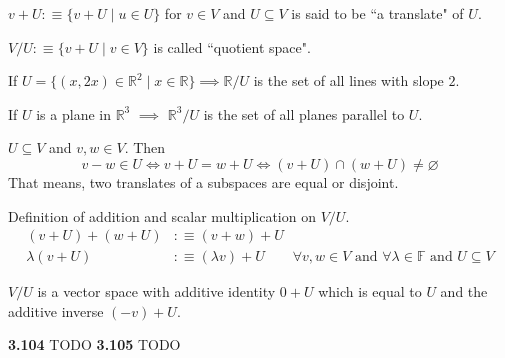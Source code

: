 \setcounter{thm}{94}
\begin{mydef}
  $v+U :\equiv \{v+U \mid u\in U\}$ for $v\in V$ and $U\subseteq V$ is said to be ``a translate" of $U$.
\end{mydef}

\setcounter{thm}{98}
\begin{mydef}
  $V/U :\equiv \{v+U \mid v\in V\}$ is called ``quotient space".
\end{mydef}

\begin{example}
  If $U=\{ (x,2x)\in \mathbb{R}^2 \mid x\in \mathbb{R} \} \implies \mathbb{R}/U$ is the set of all lines with slope $2$.
\end{example}

\begin{example}
  If $U$ is a plane in $\mathbb{R}^3$ $\implies$ $\mathbb{R}^3/U$ is the set of all planes parallel to $U$.
\end{example}


\setcounter{thm}{100}
\begin{thm}
  $ U \subseteq V$ and $v,w\in V$. Then
  \begin{equation}
    v-w \in U \iff v+U = w + U \iff (v+U) \cap (w+U) \neq \varnothing
  \end{equation}
  That means, two translates of a subspaces are equal or disjoint.
\end{thm}

\begin{mydef}
  Definition of addition and scalar multiplication on $V/U$.
  \begin{equation}
    \begin{aligned}
      (v+U)+(w+U) & :\equiv (v+w) + U \\
      \lambda (v+U) & :\equiv (\lambda v) + U \qquad \forall v,w \in V \text{ and } \forall \lambda \in \mathbb{F}
      \text{ and } U \subseteq V
    \end{aligned}
  \end{equation}
\end{mydef}


\begin{thm}
  $V/U$ is a vector space with additive identity $0+U$ which is equal to $U$ and the additive inverse $(-v)+U$.
\end{thm}

\textbf{3.104} TODO \textbf{3.105} TODO \\